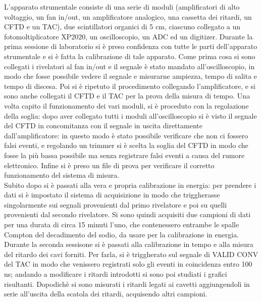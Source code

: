 L'apparato strumentale consiste di una serie di moduli (amplificatori di alto voltaggio, un fan in/out, un amplificatore analogico, una cassetta dei ritardi, un CFTD e un TAC),
due scintillatori organici di 5 cm, ciascuno collegato a un fotomoltiplicatore XP2020,  un oscilloscopio, un ADC ed un digitizer.
Durante la prima sessione di laboratorio si è preso confidenza con tutte le parti dell'apparato
strumentale e si è fatta la calibrazione di tale apparato. Come prima cosa si sono collegati i rivelatori al fan in/out e il segnale è stato mandato all'oscilloscopio,
in modo che fosse possibile vedere il segnale e misurarne ampiezza, tempo di salita e tempo di discesa. Poi si è ripetuto il procedimento collegando l'amplificatore, e si
sono anche collegati il CFTD e il TAC per la prova della misura di tempo. Una volta capito il funzionamento dei vari moduli, si è proceduto con la regolazione della soglia:
dopo aver collegato tutti i moduli all'oscilloscopio si è visto il segnale del CFTD in concomitanza con il segnale in uscita direttamente dall'amplificatore: in
questo modo è stato possibile verificare che non ci fossero falsi eventi, e regolando un trimmer si è scelta la soglia del CFTD in modo che fosse la più bassa possibile
ma senza registrare falsi eventi a causa del rumore elettronico. Infine si è preso un file di prova per verificare il corretto funzionamento del sistema di misura.\\

Subito dopo si è passati alla vera e propria calibrazione in energia: per prendere i dati si è impostato il sistema di acquisizione in modo che triggherasse singolarmente
sui segnali provenienti dal primo rivelatore e poi su quelli provenienti dal secondo rivelatore. Si sono quindi acquisiti due campioni di dati per una durata di circa 
15 minuti l'uno, che
contenessero entrambe le spalle Compton del decadimento del sodio, da usare per la calibrazione in energia.\\

Durante la seconda sessisone si è passati alla calibrazione in tempo e alla misura del ritardo dei cavi forniti. Per farla, si è triggherato sul segnale di VALID CONV del TAC in modo che venissero registrati solo gli eventi in coincidenza entro 100 ns; andando a modificare i ritardi introdotti si sono poi studiati i grafici risultanti. Dopodichè si sono misurati i ritardi legati ai cavetti aggiungendoli
in serie all'uscita della scatola dei ritardi, acquisendo altri campioni.\\

